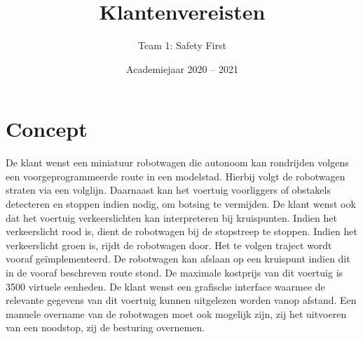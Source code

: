 \documentclass[a4paper,kulak]{kulakarticle} %
\date{Academiejaar 2020 -- 2021}
\title{Klantenvereisten}
\author{Team 1: Safety First}
\begin{document}
\maketitle

\section*{Concept}

De klant wenst een miniatuur robotwagen die autonoom kan rondrijden volgens een voorgeprogrammeerde route in een modelstad. Hierbij volgt de robotwagen straten via een volglijn. Daarnaast kan het voertuig voorliggers of obstakels detecteren en stoppen indien nodig, om botsing te vermijden. De klant wenst ook dat het voertuig verkeerslichten kan interpreteren bij kruispunten. Indien het verkeerslicht rood is, dient de robotwagen bij de stopstreep te stoppen. Indien het verkeerslicht groen is, rijdt de robotwagen door.  Het te volgen traject wordt vooraf geïmplementeerd. De robotwagen kan afslaan op een kruispunt indien dit in de vooraf beschreven route stond. De maximale kostprijs van dit voertuig is 3500 virtuele eenheden. De klant wenst een grafische interface waarmee de relevante gegevens van dit voertuig kunnen uitgelezen worden vanop afstand. Een manuele overname van de robotwagen moet ook mogelijk zijn, zij het uitvoeren van een noodstop, zij de besturing overnemen.
\end{document}
